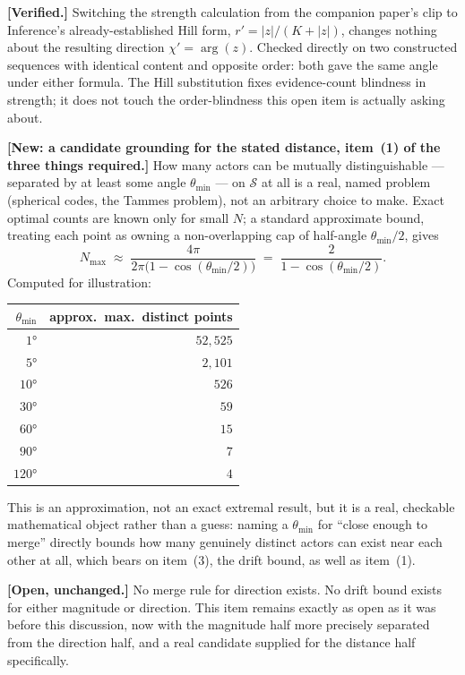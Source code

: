 \documentclass[11pt]{article}
\begin{document}
\textbf{[Verified.]} Switching the strength calculation from the
companion paper's clip to Inference's already-established Hill form,
$r'=|z|/(K+|z|)$, changes nothing about the resulting direction
$\chi'=\arg(z)$. Checked directly on two constructed sequences with
identical content and opposite order: both gave the same angle under
either formula. The Hill substitution fixes evidence-count blindness
in strength; it does not touch the order-blindness this open item is
actually asking about.

\textbf{[New: a candidate grounding for the stated distance,
item~(1) of the three things required.]} How many actors can be
mutually distinguishable --- separated by at least some angle
$\theta_{\min}$ --- on $\mathcal{S}$ at all is a real, named problem
(spherical codes, the Tammes problem), not an arbitrary choice to
make. Exact optimal counts are known only for small $N$; a standard
approximate bound, treating each point as owning a non-overlapping
cap of half-angle $\theta_{\min}/2$, gives
\[
N_{\max} \;\approx\; \frac{4\pi}{2\pi\bigl(1-\cos(\theta_{\min}/2)\bigr)}
\;=\; \frac{2}{1-\cos(\theta_{\min}/2)}.
\]
Computed for illustration:
\begin{center}
\begin{tabular}{rr}
$\theta_{\min}$ & approx.\ max.\ distinct points \\
\hline
$1°$   & $52{,}525$ \\
$5°$   & $2{,}101$ \\
$10°$  & $526$ \\
$30°$  & $59$ \\
$60°$  & $15$ \\
$90°$  & $7$ \\
$120°$ & $4$ \\
\end{tabular}
\end{center}
This is an approximation, not an exact extremal result, but it is a
real, checkable mathematical object rather than a guess: naming a
$\theta_{\min}$ for ``close enough to merge'' directly bounds how many
genuinely distinct actors can exist near each other at all, which
bears on item~(3), the drift bound, as well as item~(1).

\textbf{[Open, unchanged.]} No merge rule for direction exists. No
drift bound exists for either magnitude or direction. This item
remains exactly as open as it was before this discussion, now with
the magnitude half more precisely separated from the direction half,
and a real candidate supplied for the distance half specifically.
\end{document}
